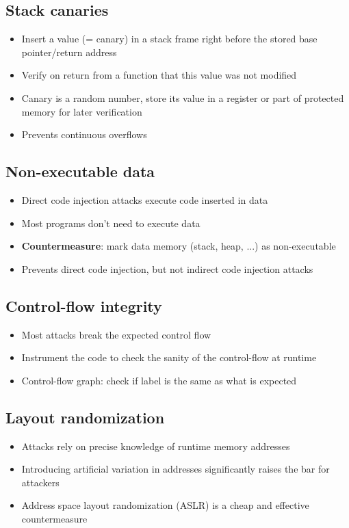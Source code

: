 \documentclass[12pt,titlepage,a4paper]{report}
\begin{document}
			\subsection{Stack canaries}
				\begin{itemize}
					\item Insert a value (= canary) in a stack frame right before the stored base pointer/return address
					\item Verify on return from a function that this value was not modified
					\item Canary is a random number, store its value in a register or part of protected memory for later verification
					\item Prevents continuous overflows
				\end{itemize}
			
			\subsection{Non-executable data}
				\begin{itemize}
					\item Direct code injection attacks execute code inserted in data
					\item Most programs don't need to execute data
					\item \textbf{Countermeasure}: mark data memory (stack, heap, ...) as non-executable
					\item Prevents direct code injection, but not indirect code injection attacks
				\end{itemize}
			
			\subsection{Control-flow integrity}
				\begin{itemize}
					\item Most attacks break the expected control flow
					\item Instrument the code to check the sanity of the control-flow at runtime
					\item Control-flow graph: check if label is the same as what is expected
				\end{itemize}
			
			\subsection{Layout randomization}
				\begin{itemize}
					\item Attacks rely on precise knowledge of runtime memory addresses
					\item Introducing artificial variation in addresses significantly raises the bar for attackers
					\item Address space layout randomization (ASLR) is a cheap and effective countermeasure
				\end{itemize}
\end{document}
